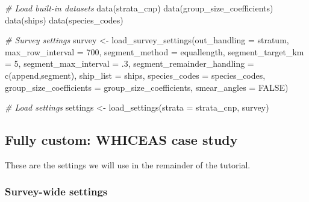 \documentclass[
]{book}
\newenvironment{Shaded}{\begin{snugshade}}{\end{snugshade}}
\newcommand{\AttributeTok}[1]{\textcolor[rgb]{0.77,0.63,0.00}{#1}}
\newcommand{\CommentTok}[1]{\textcolor[rgb]{0.56,0.35,0.01}{\textit{#1}}}
\newcommand{\ConstantTok}[1]{\textcolor[rgb]{0.00,0.00,0.00}{#1}}
\newcommand{\DecValTok}[1]{\textcolor[rgb]{0.00,0.00,0.81}{#1}}
\newcommand{\FunctionTok}[1]{\textcolor[rgb]{0.00,0.00,0.00}{#1}}
\newcommand{\NormalTok}[1]{#1}
\newcommand{\OtherTok}[1]{\textcolor[rgb]{0.56,0.35,0.01}{#1}}
\newcommand{\StringTok}[1]{\textcolor[rgb]{0.31,0.60,0.02}{#1}}
\begin{document}
\begin{Shaded}
\begin{Highlighting}[]
\CommentTok{\# Load built{-}in datasets}
\FunctionTok{data}\NormalTok{(strata\_cnp)}
\FunctionTok{data}\NormalTok{(group\_size\_coefficients)}
\FunctionTok{data}\NormalTok{(ships)}
\FunctionTok{data}\NormalTok{(species\_codes)}

\CommentTok{\# Survey settings}
\NormalTok{survey }\OtherTok{\textless{}{-}} 
  \FunctionTok{load\_survey\_settings}\NormalTok{(}\AttributeTok{out\_handling =} \StringTok{\textquotesingle{}stratum\textquotesingle{}}\NormalTok{,}
                       \AttributeTok{max\_row\_interval =} \DecValTok{700}\NormalTok{,}
                       \AttributeTok{segment\_method =} \StringTok{\textquotesingle{}equallength\textquotesingle{}}\NormalTok{,}
                       \AttributeTok{segment\_target\_km =} \DecValTok{5}\NormalTok{,}
                       \AttributeTok{segment\_max\_interval =}\NormalTok{ .}\DecValTok{3}\NormalTok{,}
                       \AttributeTok{segment\_remainder\_handling =} \FunctionTok{c}\NormalTok{(}\StringTok{\textquotesingle{}append\textquotesingle{}}\NormalTok{,}\StringTok{\textquotesingle{}segment\textquotesingle{}}\NormalTok{),}
                       \AttributeTok{ship\_list =}\NormalTok{ ships,}
                       \AttributeTok{species\_codes =}\NormalTok{ species\_codes,}
                       \AttributeTok{group\_size\_coefficients =}\NormalTok{ group\_size\_coefficients,}
                       \AttributeTok{smear\_angles =} \ConstantTok{FALSE}\NormalTok{)}

\CommentTok{\# Load settings}
\NormalTok{settings }\OtherTok{\textless{}{-}} \FunctionTok{load\_settings}\NormalTok{(}\AttributeTok{strata =}\NormalTok{ strata\_cnp,}
\NormalTok{                          survey)}
\end{Highlighting}
\end{Shaded}

\hypertarget{fully-custom-whiceas-case-study}{%
\subsection*{Fully custom: WHICEAS case study}\label{fully-custom-whiceas-case-study}}

These are the settings we will use in the remainder of the tutorial.

\hypertarget{survey-wide-settings-1}{%
\subsubsection*{Survey-wide settings}\label{survey-wide-settings-1}}
\end{document}

